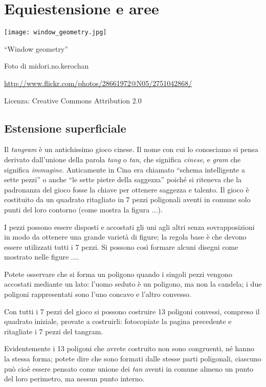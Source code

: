 \chapter{Equiestensione e aree}

\texttt{[image: window\_geometry.jpg]}
  \begin{center}
    {\large ``Window geometry''}\par
    Foto di midori.no.kerochan\par
    \url{http://www.flickr.com/photos/28661972@N05/2751042868/}\par
    Licenza: Creative Commons Attribution 2.0\par
  \end{center}
\newpage


\section{Estensione superficiale}

Il \emph{tangram}\label{tangram} è un antichissimo gioco cinese. Il nome con cui lo conosciamo si pensa derivato dall'unione della parola \emph{tang} o \emph{tan}, che significa \emph{cinese}, e \emph{gram} che significa \emph{immagine}. Anticamente in Cina era chiamato ``schema intelligente a sette pezzi'' o anche ``le sette pietre della saggezza'' poiché si riteneva che la padronanza del gioco fosse la chiave per ottenere saggezza e talento.
Il gioco è costituito da un quadrato ritagliato in 7 pezzi poligonali aventi in comune solo punti del loro contorno (come mostra la figura ...).


I pezzi possono essere disposti e accostati gli uni agli altri senza sovrapposizioni in modo da ottenere una grande varietà di figure; la regola base è che devono essere utilizzati tutti i 7 pezzi. Si possono così formare alcuni disegni come mostrato nelle figure ....

Potete osservare che si forma un poligono quando i singoli pezzi vengono accostati mediante un lato: l'uomo seduto è un poligono, ma non la candela; i due poligoni rappresentati sono l'uno concavo e l'altro convesso.

Con tutti i 7 pezzi del gioco si possono costruire 13 poligoni convessi, compreso il quadrato iniziale, provate a costruirli: fotocopiate la pagina precedente e ritagliate i 7 pezzi del tangram.

Evidentemente i 13 poligoni che avrete costruito non sono congruenti, né hanno la stessa forma; potete dire che sono formati dalle stesse parti poligonali, ciascuno può cioè essere pensato come unione dei \emph{tan} aventi in comune almeno un punto del loro perimetro, ma nessun punto interno.


